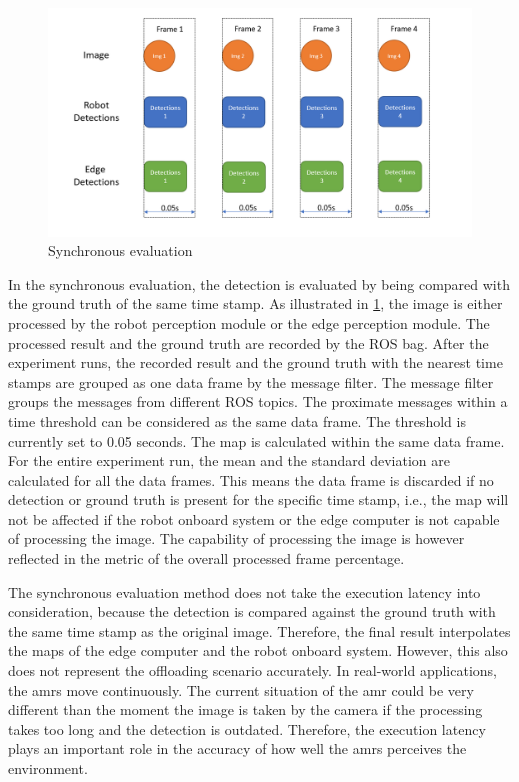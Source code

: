 \begin{figure}[htp]
    \centering
    \includegraphics[width=\linewidth]{figures/setup/sync_eval.png}
    \caption{Synchronous evaluation}
    \label{fig:sync_eval}
\end{figure}

In the synchronous evaluation, the detection is evaluated by being compared with the ground truth of the same time stamp. As illustrated in \cref{fig:sync_eval}, the image is either processed by the robot perception module or the edge perception module. The processed result and the ground truth are recorded by the ROS bag. After the experiment runs, the recorded result and the ground truth with the nearest time stamps are grouped as one data frame by the message filter. The message filter groups the messages from different ROS topics. The proximate messages within a time threshold can be considered as the same data frame. The threshold is currently set to 0.05 seconds. The \gls{map} is calculated within the same data frame. For the entire experiment run, the mean and the standard deviation are calculated for all the data frames. This means the data frame is discarded if no detection or ground truth is present for the specific time stamp, i.e., the \gls{map} will not be affected if the robot onboard system or the edge computer is not capable of processing the image. The capability of processing the image is however reflected in the metric of the overall processed frame percentage. 

The synchronous evaluation method does not take the execution latency into consideration, because the detection is compared against the ground truth with the same time stamp as the original image. Therefore, the final result interpolates the \glspl{map} of the edge computer and the robot onboard system. However, this also does not represent the offloading scenario accurately. In real-world applications, the \glspl{amr} move continuously. The current situation of the \gls{amr} could be very different than the moment the image is taken by the camera if the processing takes too long and the detection is outdated. Therefore, the execution latency plays an important role in the accuracy of how well the \glspl{amr} perceives the environment. 

